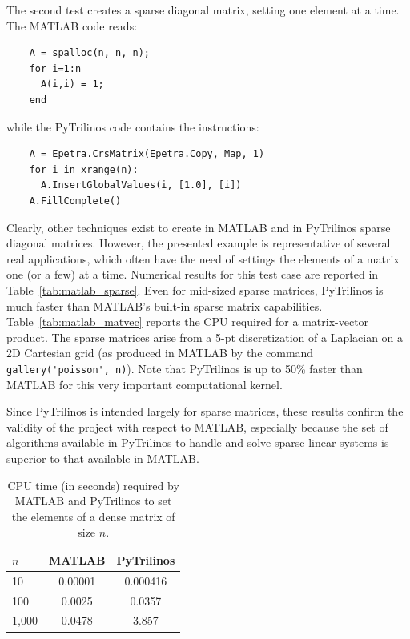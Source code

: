 \documentclass[acmtocl]{acmtrans2m}
\begin{document}
The second test creates a sparse diagonal matrix, setting
one element at a time. The MATLAB code reads:
\begin{verbatim}
    A = spalloc(n, n, n);
    for i=1:n
      A(i,i) = 1;
    end
\end{verbatim}
while the PyTrilinos code contains the instructions:
\begin{verbatim}
    A = Epetra.CrsMatrix(Epetra.Copy, Map, 1)
    for i in xrange(n):
      A.InsertGlobalValues(i, [1.0], [i])
    A.FillComplete()
\end{verbatim}
Clearly, other techniques exist to create in MATLAB and in PyTrilinos
sparse diagonal matrices. However, the presented example is representative of
several real applications, which often have the
need of settings the elements of a matrix one (or a few) at a time. Numerical
results for this test case are reported in Table~\ref{tab:matlab_sparse}. Even
for mid-sized sparse matrices, PyTrilinos is much faster than MATLAB's
built-in sparse matrix capabilities.
Table~\ref{tab:matlab_matvec} reports the CPU required for a matrix-vector
product. The sparse matrices arise from
a 5-pt discretization of a Laplacian on a 2D Cartesian grid
(as produced in MATLAB by the command \verb!gallery('poisson', n)!).  Note
that PyTrilinos is up to 50\% faster than MATLAB for this very
important computational kernel.

Since PyTrilinos is intended largely
for sparse matrices, these results confirm the validity of the project
with respect to MATLAB, especially because the set of algorithms
available in PyTrilinos to handle and solve sparse linear systems is
superior to that available in MATLAB.

\begin{table}
  \begin{center}
    \begin{tabular}{| l | c | c |}
      \hline
      $n$ & MATLAB & PyTrilinos \\
      \hline
      \hline
      10     & 0.00001 & 0.000416 \\
      100    & 0.0025 & 0.0357    \\
      1,000  & 0.0478 & 3.857     \\
      \hline
    \end{tabular}
    \caption{CPU time (in seconds) required by MATLAB and PyTrilinos
      to set the elements of a dense matrix of size $n$.}
    \label{tab:matlab_dense}
  \end{center}
\end{table}
\end{document}
